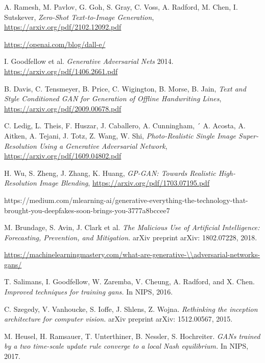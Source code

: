 \documentclass[12pt,a4paper,openany]{book}
\begin{document}
\begin{thebibliography}{a,b,c}

 A. Ramesh, M. Pavlov, G. Goh, S. Gray, C. Voss, A. Radford, M. Chen, I. Sutskever, {\it Zero-Shot Text-to-Image Generation}, \url{https://arxiv.org/pdf/2102.12092.pdf}

 \url{https://openai.com/blog/dall-e/}

 I. Goodfellow et al.  {\it Generative Adversarial Nets} 2014.  \url{https://arxiv.org/pdf/1406.2661.pdf}

 B. Davis, C. Tensmeyer, B. Price, C. Wigington, B. Morse, B. Jain,  {\it Text and Style Conditioned GAN for
Generation of Offline Handwriting Lines},  \url{https://arxiv.org/pdf/2009.00678.pdf}

 C. Ledig, L. Theis, F.  Huszar, J. Caballero, A. Cunningham, ´
A. Acosta, A. Aitken, A. Tejani, J. Totz, Z. Wang, W. Shi, {\it Photo-Realistic Single Image Super-Resolution Using a Generative Adversarial
Network}, \url{https://arxiv.org/pdf/1609.04802.pdf}

 H. Wu, S. Zheng, J. Zhang, K. Huang, {\it GP-GAN: Towards Realistic High-Resolution Image Blending}, \url{https://arxiv.org/pdf/1703.07195.pdf}

 https://medium.com/mlearning-ai/generative-everything-the-technology-that-brought-you-deepfakes-soon-brings-you-3777a8bccee7

 M. Brundage, S. Avin, J. Clark et al. {\it The Malicious Use of Artificial Intelligence: Forecasting, Prevention, and Mitigation.} arXiv preprint arXiv: 1802.07228, 2018.

 \url{https://machinelearningmastery.com/what-are-generative-\\adversarial-networks-gans/}

 T. Salimans, I. Goodfellow, W. Zaremba, V. Cheung, A. Radford, and X. Chen. {\it Improved techniques for training gans.} In NIPS, 2016.

 C. Szegedy, V. Vanhoucke, S. Ioffe, J. Shlens, Z. Wojna. {\it Rethinking the inception architecture for computer vision.} arXiv preprint arXiv: 1512.00567, 2015.

 M. Heusel, H. Ramsauer, T. Unterthiner, B. Nessler, S. Hochreiter. {\it GANs trained by a two time-scale update rule converge to a local Nash equilibrium.} In NIPS, 2017.


\end{thebibliography}
\end{document}

